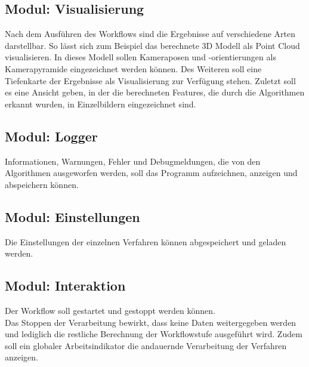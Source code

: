 \subsection{Modul: Visualisierung}
Nach dem Ausführen des Workflows sind die Ergebnisse auf verschiedene Arten darstellbar. So lässt sich zum Beispiel das berechnete 3D Modell als Point Cloud visualisieren. In dieses Modell sollen Kameraposen und -orientierungen als Kamerapyramide eingezeichnet werden können. Des Weiteren soll eine Tiefenkarte der Ergebnisse als Visualisierung zur Verfügung stehen. Zuletzt soll es eine Ansicht geben, in der die berechneten Features, die durch die Algorithmen erkannt wurden, in Einzelbildern eingezeichnet sind. 
\subsection{Modul: Logger}
Informationen, Warnungen, Fehler und Debugmeldungen, die von den Algorithmen ausgeworfen werden, soll das Programm aufzeichnen, anzeigen und abspeichern können.
\subsection{Modul: Einstellungen}
Die Einstellungen der einzelnen Verfahren können abgespeichert und geladen werden.
\subsection{Modul: Interaktion}
Der Workflow soll gestartet und gestoppt werden können.\\Das Stoppen der Verarbeitung bewirkt, dass keine Daten weitergegeben werden und lediglich die restliche Berechnung der Workflowstufe ausgeführt wird. Zudem soll ein globaler Arbeitsindikator die andauernde Verarbeitung der Verfahren anzeigen.


